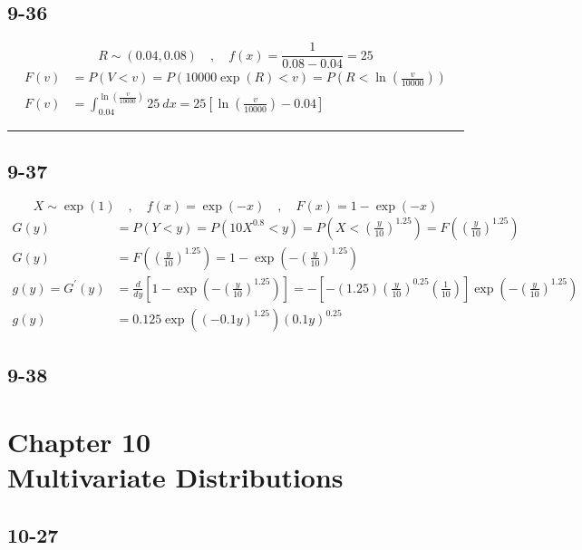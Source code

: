 \documentclass{article}
\newcommand{\qline}{\par\noindent\rule{4.5in}{1pt}}
\begin{document}
		\subsection*{9-36}

			\[
				R \sim \left( 0.04, 0.08 \right) \quad,\quad f(x) = \frac{1}{0.08-0.04} = 25
			\]
			\begin{equation*}
				\begin{split}
					F(v) &= P(V < v) = P(10000\exp(R) < v) = P(R < \ln\left( \frac{v}{10000} \right)) \\
					F(v) &= \int_{0.04}^{\ln\left( \frac{v}{10000} \right)} 25 \ dx = \boxed{25 \left[ \ln\left( \frac{v}{10000} \right) - 0.04 \right]}
				\end{split}
			\end{equation*}

	\qline

		\subsection*{9-37}

			\[
				X \sim \exp(1) \quad,\quad f(x) = \exp\left( -x \right) \quad,\quad F(x) = 1 - \exp\left( -x \right)
			\]
			\begin{equation*}
				\begin{split}
					G(y) &= P(Y < y) = P(10X^{0.8} < y) = P\left( X < \left( \frac{y}{10} \right)^{1.25} \right) = F\left( \left( \frac{y}{10} \right)^{1.25} \right) \\
					G(y) &= F\left( \left( \frac{y}{10} \right)^{1.25} \right) = 1 - \exp\left( -\left( \frac{y}{10} \right)^{1.25} \right) \\
					g(y) = G^\prime(y) &= \frac{d}{dy} \left[ 1 - \exp\left( -\left( \frac{y}{10} \right)^{1.25} \right) \right] = -\left[ -(1.25)\left( \frac{y}{10} \right)^{0.25} \left( \frac{1}{10} \right) \right]\exp\left( - \left( \frac{y}{10} \right)^{1.25} \right) \\
					g(y) &= \boxed{0.125 \exp\left( \left(-0.1y\right)^{1.25} \right)(0.1y)^{0.25}}
				\end{split}
			\end{equation*}

	\clearpage

		\subsection*{9-38}



	\clearpage

	\section[Chapter 10: Multivariate Distributions]{Chapter 10 \\
	Multivariate Distributions}

		\subsection*{10-27}

	\clearpage
\end{document}
